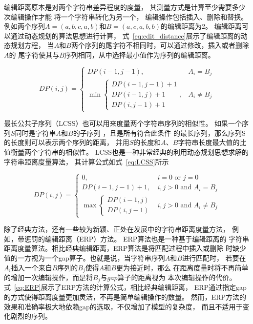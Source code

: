 编辑距离原本是对两个字符串差异程度的度量，
其测量方式是计算至少需要多少次编辑操作才能
将一个字符串转化为另一个，
编辑操作包括插入、删除和替换\cite{DBLP:journals/prl/Gorecki14}。
例如两个序列$A=\left(a,b,c,a,b\right)$和$B=\left(a,c,a,b,b\right)$的编辑距离为2。
编辑距离可以通过动态规划的算法思想进行计算，
式~\ref{eq:edit_distance}展示了编辑距离的动态规划方程，
当$A$和$B$两个序列的尾字符不相同时，可以通过修改，插入或者删除$A$的
尾字符使其与$B$序列相同，从中选择最小值作为序列的编辑距离。


\begin{equation}
  DP(i, j)= \begin{cases}DP(i-1, j-1), & A_{i}=B_{j} \\
    \min \left\{\begin{array}{c}
    D P(i-1, j-1)+1 \\
    D P(i-1, j)+1 \\
    D P(i, j-1)+1
    \end{array}\right. , & A_{i} \neq B_{j}
  \end{cases}
  \label{eq:edit_distance}
\end{equation}

最长公共子序列（LCSS）也可以用来度量两个字符串序列的相似性。
如果一个序列$S$同时是字符串$A$和$B$的子序列
\cite{DBLP:conf/spire/BergrothHR00}，且是所有符合此条件
的最长序列，那么序列S的长度则可以表示两个序列的距离，
并用$S$的长度和$A$、$B$字符串长度最大值的比值衡量两个字符串的相似性。
LCSS也是一种非常经典的利用动态规划思想求解的字符串距离度量算法，
其计算公式如式~\ref{eq:LCSS}所示

\begin{equation}
  D P(i, j)= \begin{cases}0, & i=0 \text { or } j=0 \\ D P(i-1, j-1)+1, & i, j>0 \text { and } A_{i}=B_{j} \\ \max \begin{cases}D P(i-1, j) \\ D P(i, j-1)\end{cases} & i, j>0 \text { and } A_{i} \neq B_{j}\end{cases}
  \label{eq:LCSS}
\end{equation}

除了经典方法，还有一些较为新颖、正处在发展中的字符串距离度量方法，
例如，带惩罚的编辑距离（ERP）方法\cite{DBLP:conf/vldb/ChenN04}。
ERP算法也是一种基于编辑距离的
字符串距离度量算法。相比经典编辑距离，ERP算法是将匹配过程中插入或删除
时缺少值的一方视为一个gap算子。也就是说，当字符串序列$A$和$B$进行匹配时，
若要在$A_i$插入一个来自$B$序列的$B_j$使得$A$和$B$更为接近时，那么
在距离度量时将不再简单的增加一次编辑操作，而是将$B_j$与$gap$算子的距离视为
本次编辑操作的代价。式~\ref{eq:ERP}展示了ERP方法的计算公式，相比经典编辑距离，
ERP通过指定gap的方式使得距离度量更加灵活，不再是简单编辑操作的数量。
然而，ERP方法的效果和准确率极大地依赖gap的选取，不仅增加了模型的复杂度，
而且不适用于变化剧烈的序列。

